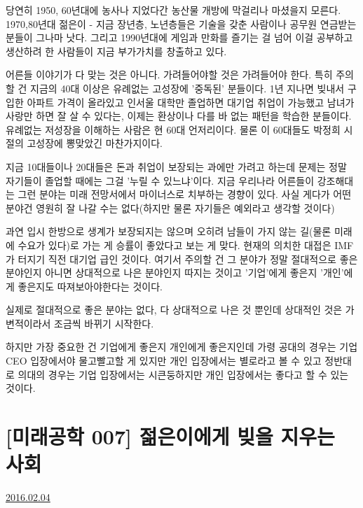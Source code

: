 당연히 1950, 60년대에 농사나 지었다간 농산물 개방에 막걸리나 마셨을지 모른다.
1970,80년대 젊은이 - 지금 장년층, 노년층들은 기술을 갖춘 사람이나 공무원 연금받는 분들이 그나마 낫다.
그리고 1990년대에 게임과 만화를 즐기는 걸 넘어 이걸 공부하고 생산하려 한 사람들이 지금 부가가치를 창출하고 있다.
\vspace{5mm}

어른들 이야기가 다 맞는 것은 아니다. 가려들어야할 것은 가려들어야 한다.
특히 주의할 건 지금의 40대 이상은 유례없는 고성장에 '중독된' 분들이다.
1년 지나면 빚내서 구입한 아파트 가격이 올라있고 인서울 대학만 졸업하면 대기업 취업이 가능했고
남녀가 사랑만 하면 잘 살 수 있다는, 이제는 환상이나 다를 바 없는 패턴을 학습한 분들이다.
유례없는 저성장을 이해하는 사람은 현 60대 언저리이다. 물론 이 60대들도 박정희 시절의 고성장에 뽕맞았긴 마찬가지이다.
\vspace{5mm}

지금 10대들이나 20대들은 돈과 취업이 보장되는 과에만 가려고 하는데
문제는 정말 자기들이 졸업할 때에는 그걸 '누릴 수 있느냐'이다.
지금 우리나라 어른들이 강조해대는 그런 분야는 미래 전망서에서 마이너스로 치부하는 경향이 있다.
사실 게다가 어떤 분야건 영원히 잘 나갈 수는 없다(하지만 물론 자기들은 예외라고 생각할 것이다)
\vspace{5mm}

과연 입시 한방으로 생계가 보장되지는 않으며
오히려 남들이 가지 않는 길(물론 미래에 수요가 있다)로 가는 게 승률이 좋았다고 보는 게 맞다.
현재의 의치한 대접은 IMF가 터지기 직전 대기업 급인 것이다.
여기서 주의할 건 그 분야가 정말 절대적으로 좋은 분야인지 아니면 상대적으로 나은 분야인지 따지는 것이고
'기업'에게 좋은지 '개인'에게 좋은지도 따져보아야한다는 것이다.
\vspace{5mm}

실제로 절대적으로 좋은 분야는 없다, 다 상대적으로 나은 것 뿐인데
상대적인 것은 가변적이라서 조금씩 바뀌기 시작한다.
\vspace{5mm}

하지만 가장 중요한 건 기업에게 좋은지 개인에게 좋은지인데
가령 공대의 경우는 기업 CEO 입장에서야 물고빨고할 게 있지만 개인 입장에서는 별로라고 볼 수 있고
정반대로 의대의 경우는 기업 입장에서는 시큰둥하지만 개인 입장에서는 좋다고 할 수 있는 것이다.





\section{[미래공학 007] 젊은이에게 빚을 지우는 사회}
\href{https://www.kockoc.com/Apoc/623428}{2016.02.04}

